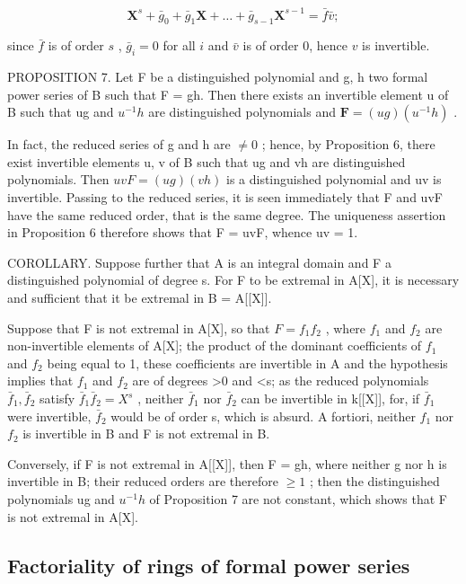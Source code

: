 \[
\mathbf {X} ^ {s} + \bar {g} _ {0} + \bar {g} _ {1} \mathbf {X} + \dots + \bar {g} _ {s - 1} \mathbf {X} ^ {s - 1} = \bar {f} \bar {v};
\]

since \(\bar{f}\) is of order \(s\) , \(\bar{g}_i = 0\) for all \(i\) and \(\bar{v}\) is of order 0, hence \(v\) is invertible.

PROPOSITION 7. Let F be a distinguished polynomial and g, h two formal power series of B such that F = gh. Then there exists an invertible element u of B such that ug and \(u^{-1}h\) are distinguished polynomials and \(\mathbf{F} = (ug)(u^{-1}h)\) .

In fact, the reduced series of g and h are \(\neq0\) ; hence, by Proposition 6, there exist invertible elements u, v of B such that ug and vh are distinguished polynomials. Then \(uvF = (ug)(vh)\) is a distinguished polynomial and uv is invertible. Passing to the reduced series, it is seen immediately that F and uvF have the same reduced order, that is the same degree. The uniqueness assertion in Proposition 6 therefore shows that F = uvF, whence uv = 1.

COROLLARY. Suppose further that A is an integral domain and F a distinguished polynomial of degree s. For F to be extremal in A{[}X{]}, it is necessary and sufficient that it be extremal in B = A{[}{[}X{]}{]}.

Suppose that F is not extremal in A{[}X{]}, so that \(F = f_{1}f_{2}\) , where \(f_{1}\) and \(f_{2}\) are non-invertible elements of A{[}X{]}; the product of the dominant coefficients of \(f_{1}\) and \(f_{2}\) being equal to 1, these coefficients are invertible in A and the hypothesis implies that \(f_{1}\) and \(f_{2}\) are of degrees \textgreater0 and \textless s; as the reduced polynomials \(\bar{f}_{1}, \bar{f}_{2}\) satisfy \(\bar{f}_{1}\bar{f}_{2} = X^{s}\) , neither \(\bar{f}_{1}\) nor \(\bar{f}_{2}\) can be invertible in k{[}{[}X{]}{]}, for, if \(\bar{f}_{1}\) were invertible, \(\bar{f}_{2}\) would be of order s, which is absurd. A fortiori, neither \(f_{1}\) nor \(f_{2}\) is invertible in B and F is not extremal in B.

Conversely, if F is not extremal in A{[}{[}X{]}{]}, then F = gh, where neither g nor h is invertible in B; their reduced orders are therefore \(\geqslant 1\) ; then the distinguished polynomials ug and \(u^{-1}h\) of Proposition 7 are not constant, which shows that F is not extremal in A{[}X{]}.

\subsection{Factoriality of rings of formal power series}

